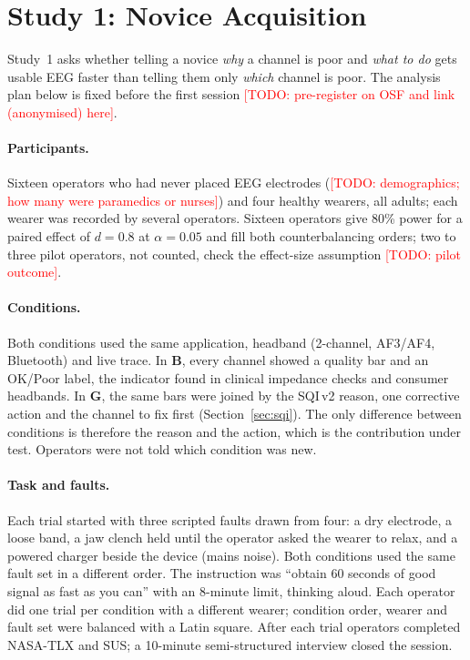\documentclass[sigconf,review,anonymous]{acmart}
\newcommand{\TODO}[1]{\textcolor{red}{[TODO: #1]}}
\newcommand{\sqiv}{SQI\,v2}
\begin{document}
\section{Study 1: Novice Acquisition}
\label{sec:study1}
Study~1 asks whether telling a novice \emph{why} a channel is poor and \emph{what to do} gets usable EEG faster than telling them only \emph{which} channel is poor.
The analysis plan below is fixed before the first session \TODO{pre-register on OSF and link (anonymised) here}.

\paragraph{Participants.}
Sixteen operators who had never placed EEG electrodes (\TODO{demographics; how many were paramedics or nurses}) and four healthy wearers, all adults; each wearer was recorded by several operators.
Sixteen operators give 80\% power for a paired effect of $d=0.8$ at $\alpha=0.05$ and fill both counterbalancing orders; two to three pilot operators, not counted, check the effect-size assumption \TODO{pilot outcome}.

\paragraph{Conditions.}
Both conditions used the same application, headband (2-channel, AF3/AF4, Bluetooth) and live trace.
In \textbf{B}, every channel showed a quality bar and an OK/Poor label, the indicator found in clinical impedance checks and consumer headbands.
In \textbf{G}, the same bars were joined by the \sqiv{} reason, one corrective action and the channel to fix first (Section~\ref{sec:sqi}).
The only difference between conditions is therefore the reason and the action, which is the contribution under test.
Operators were not told which condition was new.

\paragraph{Task and faults.}
Each trial started with three scripted faults drawn from four: a dry electrode, a loose band, a jaw clench held until the operator asked the wearer to relax, and a powered charger beside the device (mains noise).
Both conditions used the same fault set in a different order.
The instruction was ``obtain 60 seconds of good signal as fast as you can'' with an 8-minute limit, thinking aloud.
Each operator did one trial per condition with a different wearer; condition order, wearer and fault set were balanced with a Latin square.
After each trial operators completed NASA-TLX and SUS; a 10-minute semi-structured interview closed the session.
\end{document}
